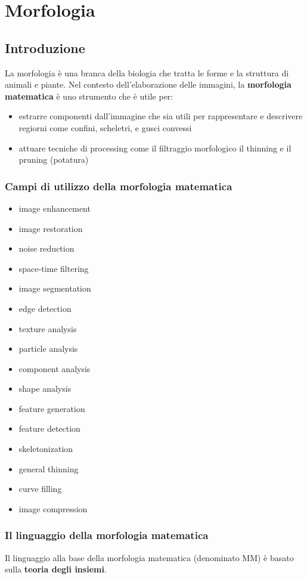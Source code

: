 \chapter{Morfologia}

\section{Introduzione}
La morfologia è una branca della biologia che tratta le forme e la struttura di animali e piante. Nel contesto dell'elaborazione delle immagini, la \textbf{morfologia matematica} è uno strumento che è utile per:

\begin{itemize}
	\item estrarre componenti dall'immagine che sia utili per rappresentare e descrivere regiorni come confini, scheletri, e gusci convessi
	
	\item attuare tecniche di processing come il filtraggio morfologico il thinning e il pruning (potatura)
\end{itemize}

\subsection{Campi di utilizzo della morfologia matematica}
\begin{itemize}
	\item image enhancement
	\item image restoration
	\item noise reduction
	\item space-time filtering
	\item image segmentation
	\item edge detection
	\item texture analysis
	\item particle analysis
	\item component analysis
	\item shape analysis
	\item feature generation
	\item feature detection
	\item skeletonization
	\item general thinning
	\item curve filling
	\item image compression
\end{itemize}

\subsection{Il linguaggio della morfologia matematica}
Il linguaggio alla base della morfologia matematica (denominato MM) è basato sulla \textbf{teoria degli insiemi}.

